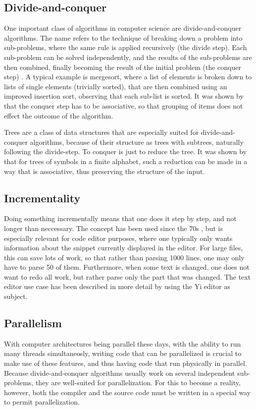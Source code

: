 \documentclass[a4paper,12pt,twosided]{report}
\renewcommand\cite{\citep}
\begin{document}
\subsection{Divide-and-conquer}
One important class of algorithms in computer science are divide-and-conquer 
algorithms. The name refers to the technique of breaking down a problem into
sub-problems, where the same rule is applied recursively (the divide step). Each
sub-problem can be solved independently, and the results of the sub-problems are
then combined, finally becoming the result of the initial problem (the conquer
step) \cite[p.209]{algorithmdesign}. A typical example is mergesort, where a
list of elements is broken down to lists of single elements (trivially sorted),
that are then combined using an improved insertion sort, observing that each
sub-list is sorted. It was shown by \citet{birdlists} that the conquer step has
to be associative, so that grouping of items does not effect the outcome of the
algorithm. 

Trees are a class of data structures that are especially suited for 
divide-and-conquer algorithms, because of their structure as trees with
subtrees, naturally following the divide-step. To conquer is just to reduce the
tree. It was shown by \citet{parparsepaper} that for trees of symbols in a
finite alphabet, such a reduction can be made in a way that is associative, thus
preserving the structure of the input. 

\subsection{Incrementality}
Doing something incrementally means that one does it step by step, and not
longer than neccessary. The concept has been used since the 70s
\cite{incrementalpaper}, but is especially relevant for code editor purposes,
where one typically only wants information about the snippet currently displayed
in the editor. For large files, this can save lots of work, so that rather than
parsing 1000 lines, one may only have to parse 50 of them. Furthermore, when
some text is changed, one does not want to redo all work, but rather parse only
the part that was changed. The text editor use case has been described in more
detail by \cite{lazyfunctional} using the Yi editor as subject. 

\subsection{Parallelism}
With computer architectures being parallel these days, with the ability to run
many threads simultaneosly, writing code that can be parallelized is crucial to
make use of these features, and thus having code that run physically in
parallel. Because divide-and-conquer algorithms usually work on several
independent sub-problems, they are well-suited for parallelization. For this to
become a reality, however, both the compiler and the source code must be written
in a special way to permit parallelization.
\end{document}
